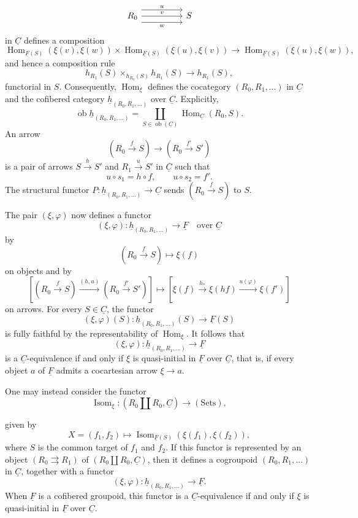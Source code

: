 
\[
\begin{tikzcd}[column sep=huge]
 R_0 \arrow[r,shift left=3,"u"]
     \arrow[r,"v"]
     \arrow[r,shift right=3,"w"']
 & S
\end{tikzcd}
\]
in $\underline C$ defines a composition
\[
 \operatorname{Hom}_{\underline F(S)}(\xi(v),\xi(w))
 \times
 \operatorname{Hom}_{\underline F(S)}(\xi(u),\xi(v))
 \longrightarrow
 \operatorname{Hom}_{\underline F(S)}(\xi(u),\xi(w)),
\]
and hence a composition rule
\[
 h_{R_1}(S)\times_{h_{R_0}(S)}h_{R_1}(S)
 \longrightarrow h_{R_1}(S),
\]
functorial in $S$. Consequently, $\operatorname{Hom}_\xi$ defines the
cocategory $(R_0,R_1,\ldots)$ in $\underline C$ and the cofibered
category $\underline h_{(R_0,R_1,\ldots)}$ over $\underline C$.
Explicitly,
\[
 \operatorname{ob}\underline h_{(R_0,R_1,\ldots)}
 =\coprod_{S\in\operatorname{ob}(\underline C)}
   \operatorname{Hom}_{\underline C}(R_0,S).
\]
An arrow
\[
 (R_0\xrightarrow fS)\longrightarrow(R_0\xrightarrow{f'}S')
\]
is a pair of arrows $S\xrightarrow hS'$ and $R_1\xrightarrow uS'$ in
$\underline C$ such that
\[
 u\circ s_1=h\circ f,
 \qquad u\circ s_2=f'.
\]
The structural functor
$P:\underline h_{(R_0,R_1,\ldots)}\longrightarrow\underline C$ sends
$(R_0\xrightarrow fS)$ to $S$.

The pair $(\xi,\varphi)$ now defines a functor
\[
 (\xi,\varphi):\underline h_{(R_0,R_1,\ldots)}
 \longrightarrow\underline F
 \quad\text{over }\underline C
\]
by
\[
 (R_0\xrightarrow fS)\longmapsto\xi(f)
\]
on objects and by
\[
 \left[(R_0\xrightarrow fS)
 \xrightarrow{(h,u)}(R_0\xrightarrow{f'}S')\right]
 \longmapsto
 \left[\xi(f)\xrightarrow{h_*}\xi(hf)
 \xrightarrow{u(\varphi)}\xi(f')\right]
\]
on arrows. For every $S\in\underline C$, the functor
\[
 (\xi,\varphi)(S):
 \underline h_{(R_0,R_1,\ldots)}(S)\longrightarrow\underline F(S)
\]
is fully faithful by the representability of
$\operatorname{Hom}_\xi$. It follows that
\[
 (\xi,\varphi):\underline h_{(R_0,R_1,\ldots)}
 \longrightarrow\underline F
\]
is a $\underline C$-equivalence if and only if $\xi$ is quasi-initial
in $\underline F$ over $\underline C$, that is, if every object $a$
of $\underline F$ admits a cocartesian arrow $\xi\longrightarrow a$.

One may instead consider the functor
\[
 \operatorname{Isom}_\xi:
 (R_0\amalg R_0,\underline C)\longrightarrow(\mathrm{Sets}),
\]


given by
\[
 X=(f_1,f_2)\longmapsto
 \operatorname{Isom}_{\underline F(S)}(\xi(f_1),\xi(f_2)),
\]
where $S$ is the common target of $f_1$ and $f_2$. If this functor is
represented by an object $(R_0\rightrightarrows R_1)$ of
$(R_0\amalg R_0,\underline C)$, then it defines a cogroupoid
$(R_0,R_1,\ldots)$ in $\underline C$, together with a functor
\[
 (\xi,\varphi):\underline h_{(R_0,R_1,\ldots)}
 \longrightarrow\underline F.
\]
When $\underline F$ is a cofibered groupoid, this functor is a
$\underline C$-equivalence if and only if $\xi$ is quasi-initial in
$\underline F$ over $\underline C$.
